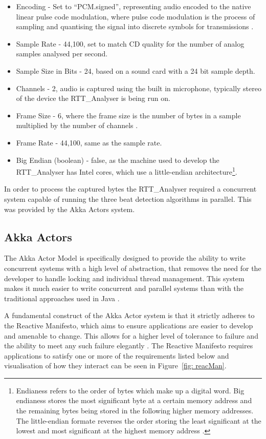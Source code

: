 \documentclass[a4paper, 11pt]{article}
\begin{document}
\begin{itemize}
\item Encoding - Set to ``PCM.signed'', representing audio encoded to the native linear pulse code modulation, where pulse code modulation is the process of sampling and quantising the signal into discrete symbols for transmissions \cite{pulseWag}.
\item Sample Rate - 44,100, set to match CD quality for the number of analog samples analysed per second. 
\item Sample Size in Bits - 24, based on a sound card with a 24 bit sample depth.
\item Channels - 2, audio is captured using the built in microphone, typically stereo of the device the RTT\_Analyser is being run on.
\item Frame Size - 6, where the frame size is the number of bytes in a sample multiplied by the number of channels \cite{audioFormat}.
\item Frame Rate - 44,100, same as the sample rate.
\item Big Endian (boolean) - false, as the machine used to develop the RTT\_Analyser has Intel cores, which use a little-endian architecture\footnote{Endianess refers to the order of bytes which make up a digital word. Big endianess stores the most significant byte at a certain memory address and the remaining bytes being stored in the following higher memory addresses. The little-endian formate reverses the order storing the least significant at the lowest and most significant at the highest memory address \cite{endiness}.}.
\end{itemize}

In order to process the captured bytes the RTT\_Analyser required a concurrent system capable of running the three beat detection algorithms in parallel. This was provided by the Akka Actors system.

\subsection{Akka Actors}
The Akka Actor Model is specifically designed to provide the ability to write concurrent systems with a high level of abstraction, that removes the need for the developer to handle locking and individual thread management. This system makes it much easier to write concurrent and parallel systems than with the traditional approaches used in Java \cite{akkaActors}.

A fundamental construct of the Akka Actor system is that it strictly adheres to the Reactive Manifesto, which aims to ensure applications are easier to develop and amenable to change. This allows for a higher level of tolerance to failure and the ability to meet any such failure elegantly \cite{reactMan}. The Reactive Manifesto requires applications to satisfy one or more of the requirements listed below \cite{reactMan} and visualisation of how they interact can be seen in Figure~\ref{fig: reacMan}.
\end{document}
